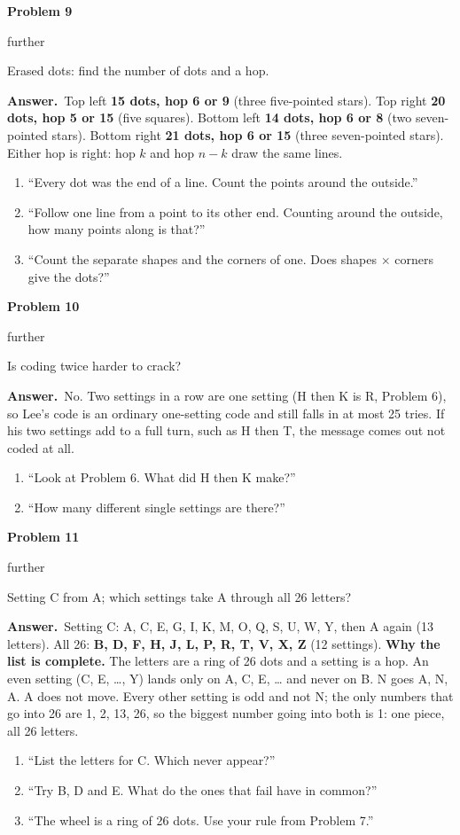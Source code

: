\documentclass[11pt]{article}
\newcommand{\lbl}[1]{\colorbox{black!10}{\footnotesize\strut #1}}
\newcommand{\further}{\lbl{further}}
\newcommand{\pb}[3]{\par\needspace{4\baselineskip}\vspace{3pt}\noindent\textbf{Problem #1}\enspace #2\enspace #3\par}
\newcommand{\ans}{\textbf{Answer.}\ }
\newenvironment{hints}{\begin{enumerate}[label={\textit{Hint \arabic*.}}, leftmargin=*, align=left]}{\end{enumerate}}
\begin{document}
\pb{9}{\further}{Erased dots: find the number of dots and a hop.}
\ans Top left \textbf{15 dots, hop 6 or 9} (three five-pointed stars). Top right \textbf{20 dots, hop 5 or 15}
(five squares). Bottom left \textbf{14 dots, hop 6 or 8} (two seven-pointed stars). Bottom right \textbf{21 dots,
hop 6 or 15} (three seven-pointed stars). Either hop is right: hop $k$ and hop $n-k$ draw the same lines.
\begin{hints}
\item ``Every dot was the end of a line. Count the points around the outside.''
\item ``Follow one line from a point to its other end. Counting around the outside, how many points along is that?''
\item ``Count the separate shapes and the corners of one. Does shapes $\times$ corners give the dots?''
\end{hints}

\pb{10}{\further}{Is coding twice harder to crack?}
\ans No. Two settings in a row are one setting (H then K is R, Problem 6), so Lee's code is an ordinary
one-setting code and still falls in at most 25 tries. If his two settings add to a full turn, such as H then T,
the message comes out not coded at all.
\begin{hints}
\item ``Look at Problem 6. What did H then K make?''
\item ``How many different single settings are there?''
\end{hints}

\pb{11}{\further}{Setting C from A; which settings take A through all 26 letters?}
\ans Setting C: A, C, E, G, I, K, M, O, Q, S, U, W, Y, then A again (13 letters). All 26:
\textbf{B, D, F, H, J, L, P, R, T, V, X, Z} (12 settings).
\textbf{Why the list is complete.} The letters are a ring of 26 dots and a setting is a hop. An even setting
(C, E, \dots, Y) lands only on A, C, E, \dots{} and never on B. N goes A, N, A. A does not move. Every other
setting is odd and not N; the only numbers that go into 26 are 1, 2, 13, 26, so the biggest number going into
both is 1: one piece, all 26 letters.
\begin{hints}
\item ``List the letters for C. Which never appear?''
\item ``Try B, D and E. What do the ones that fail have in common?''
\item ``The wheel is a ring of 26 dots. Use your rule from Problem 7.''
\end{hints}
\end{document}
